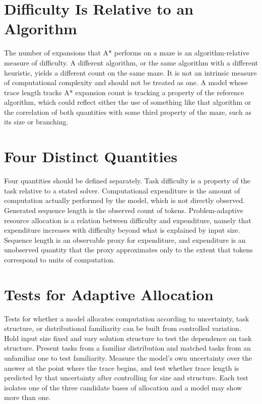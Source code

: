 \section{Difficulty Is Relative to an Algorithm}

The number of expansions that A* performs on a maze is an algorithm-relative measure of difficulty. A different algorithm, or the same algorithm with a different heuristic, yields a different count on the same maze. It is not an intrinsic measure of computational complexity and should not be treated as one. A model whose trace length tracks A* expansion count is tracking a property of the reference algorithm, which could reflect either the use of something like that algorithm or the correlation of both quantities with some third property of the maze, such as its size or branching.

\section{Four Distinct Quantities}

Four quantities should be defined separately. Task difficulty is a property of the task relative to a stated solver. Computational expenditure is the amount of computation actually performed by the model, which is not directly observed. Generated sequence length is the observed count of tokens. Problem-adaptive resource allocation is a relation between difficulty and expenditure, namely that expenditure increases with difficulty beyond what is explained by input size. Sequence length is an observable proxy for expenditure, and expenditure is an unobserved quantity that the proxy approximates only to the extent that tokens correspond to units of computation.

\section{Tests for Adaptive Allocation}

Tests for whether a model allocates computation according to uncertainty, task structure, or distributional familiarity can be built from controlled variation. Hold input size fixed and vary solution structure to test the dependence on task structure. Present tasks from a familiar distribution and matched tasks from an unfamiliar one to test familiarity. Measure the model's own uncertainty over the answer at the point where the trace begins, and test whether trace length is predicted by that uncertainty after controlling for size and structure. Each test isolates one of the three candidate bases of allocation and a model may show more than one.

